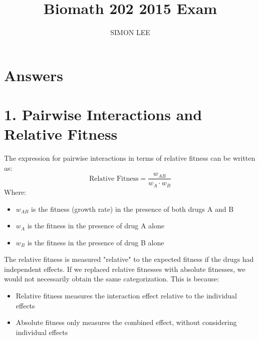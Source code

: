 \documentclass{article}
\title{Biomath 202 2015 Exam}
\author{SIMON LEE}
\date{}
\begin{document}
\maketitle

\section{Answers}

\section*{1. Pairwise Interactions and Relative Fitness}
The expression for pairwise interactions in terms of relative fitness can be written as:
\begin{equation}
\text{Relative Fitness} = \frac{w_{AB}}{w_A \cdot w_B}
\end{equation}
Where:
\begin{itemize}
\item $w_{AB}$ is the fitness (growth rate) in the presence of both drugs A and B
\item $w_A$ is the fitness in the presence of drug A alone
\item $w_B$ is the fitness in the presence of drug B alone
\end{itemize}
The relative fitness is measured "relative" to the expected fitness if the drugs had independent effects.
If we replaced relative fitnesses with absolute fitnesses, we would not necessarily obtain the same categorization. This is because:
\begin{itemize}
\item Relative fitness measures the interaction effect relative to the individual effects
\item Absolute fitness only measures the combined effect, without considering individual effects
\end{itemize}
\end{document}
